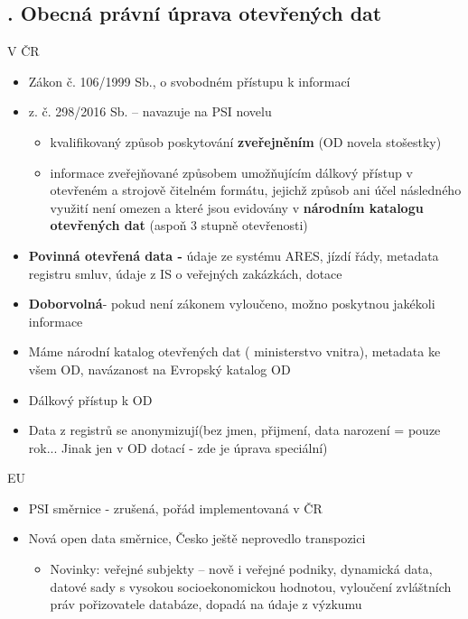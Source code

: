 \subsection{. Obecná právní úprava otevřených dat}
V ČR
\begin{itemize}
    \item Zákon č. 106/1999 Sb., o svobodném přístupu k informací
    \item {} z. č. 298/2016 Sb. – navazuje na PSI novelu
    \begin{itemize}
        \item kvalifikovaný způsob poskytování \textbf{zveřejněním} (OD novela stošestky)
    \item informace zveřejňované způsobem umožňujícím dálkový přístup v otevřeném
a strojově čitelném formátu, jejichž způsob ani účel následného využití není omezen
a které jsou evidovány v \textbf{národním katalogu otevřených dat} (aspoň 3 stupně otevřenosti)
    \end{itemize}
    \item \textbf{Povinná otevřená data - }údaje ze systému ARES, jízdí řády, metadata registru smluv, údaje z IS o veřejných zakázkách, dotace
    \item \textbf{Doborvolná}- pokud není zákonem vyloučeno, možno poskytnou jakékoli informace
    \item Máme národní katalog otevřených dat ( ministerstvo vnitra), metadata ke všem OD, navázanost na Evropský katalog OD
    \item Dálkový přístup k OD
    \item Data z registrů se anonymizují(bez jmen, přijmení, data narození = pouze rok... Jinak jen v OD dotací - zde je úprava speciální)
\end{itemize}
EU
\begin{itemize}
    \item PSI směrnice - zrušená, pořád implementovaná v ČR
    \item Nová open data směrnice, Česko ještě neprovedlo transpozici
    \begin{itemize}
        \item Novinky: veřejné subjekty – nově i veřejné podniky, dynamická data, datové sady
s vysokou socioekonomickou hodnotou, vyloučení zvláštních práv pořizovatele
databáze, dopadá na údaje z výzkumu
    \end{itemize}
\end{itemize}
